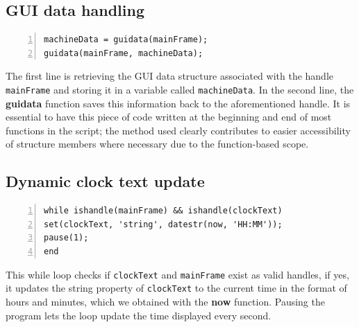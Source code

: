 \documentclass[a4paper, 11pt]{article}
\begin{document}
\subsection{GUI data handling}
\begin{lstlisting}[style=Matlab-editor, numbers = left, frame = single]
% Retrieve and save GUI data structure
machineData = guidata(mainFrame);
guidata(mainFrame, machineData);
\end{lstlisting}
\vspace{5mm}
\noindent The first line is retrieving the GUI data structure associated with the handle \texttt{mainFrame} and storing it in a variable called \texttt{machineData}. In the second line, the \textbf{guidata} function saves this information back to the aforementioned handle. It is essential to have this piece of code written at the beginning and end of most functions in the script; the method used clearly contributes to easier accessibility of structure members where necessary due to the function-based scope.
\vspace{5mm}

\subsection{Dynamic clock text update}
\begin{lstlisting}[style=Matlab-editor, numbers = left, frame = single]
% Update clock text every second
while ishandle(mainFrame) && ishandle(clockText)
set(clockText, 'string', datestr(now, 'HH:MM'));
pause(1);
end
\end{lstlisting}
\vspace{5mm}

\noindent This while loop checks if \texttt{clockText} and \texttt{mainFrame} exist as valid handles, if yes, it updates the string property of \texttt{clockText} to the current time in the format of hours and minutes, which we obtained with the \textbf{now} function. Pausing the program lets the loop update the time displayed every second.
\vspace{5mm}
\end{document}
